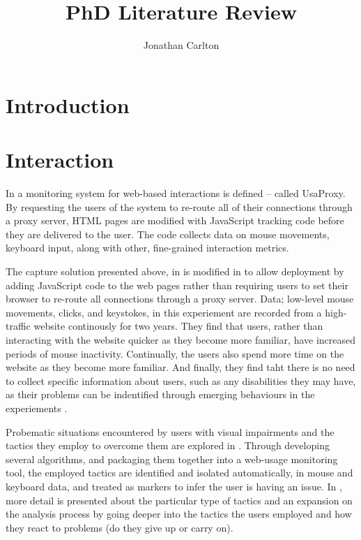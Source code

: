 \documentclass{llncs2e/llncs}
\title{PhD Literature Review}
\author{Jonathan Carlton}
\institute{School of Computer Science \\ University of Manchester \\
\email{jonathan.carlton@postgrad.manchester.ac.uk}
}
\begin{document}
  \maketitle

  \section{Introduction}

  \section{Interaction}
  In \cite{atterer2006knowing} a monitoring system for web-based interactions is
  defined -- called UsaProxy. By requesting the users of the system to re-route
  all of their connections through a proxy server, HTML pages are modified with
  JavaScript tracking code before they are delivered to the user. The code
  collects data on mouse movements, keyboard input, along with other,
  fine-grained interaction metrics.

  The capture solution presented above, in \cite{atterer2006knowing} is
  modified in \cite{apaolaza2015longitudinal} to allow deployment by adding
  JavaScript code to the web pages rather than requiring users to set their
  browser to re-route all connections through a proxy server. Data; low-level
  mouse movements, clicks, and keystokes, in this experiement are recorded from
  a high-traffic website continously for two years. They find that users, rather
  than interacting with the website quicker as they become more familiar, have
  increased periods of mouse inactivity. Continually, the users also spend
  more time on the website as they become more familiar. And finally, they
  find taht there is no need to collect specific information about users, such
  as any disabilities they may have, as their problems can be indentified through
  emerging behaviours in the experiements \cite{apaolaza2013understanding}.

  Probematic situations encountered by users with visual impairments and the tactics
  they employ to overcome them are explored in \cite{vigo2013evaluating}. Through
  developing several algorithms, and packaging them together into a web-usage
  monitoring tool, the employed tactics are identified and isolated automatically,
  in mouse and keyboard data, and treated as markers to infer the user is having
  an issue. In \cite{vigo2013coping}, more detail is presented about the particular
  type of tactics and an expansion on the analysis process by going deeper into
  the tactics the users employed and how they react to problems (do they give up
  or carry on).
\end{document}
